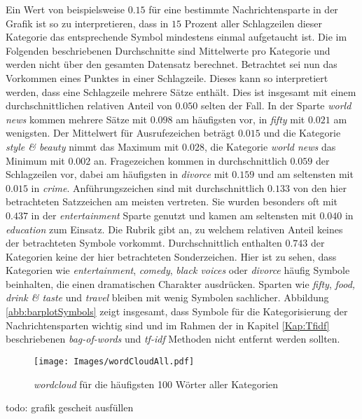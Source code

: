 \documentclass[a4paper,11pt]{article}
\begin{document}
Ein Wert von beispielsweise $0.15$ für eine bestimmte Nachrichtensparte in der Grafik ist so zu interpretieren, dass in $15$ Prozent aller Schlagzeilen dieser Kategorie das entsprechende Symbol mindestens einmal aufgetaucht ist. Die im Folgenden beschriebenen Durchschnitte sind Mittelwerte pro Kategorie und werden nicht über den gesamten Datensatz berechnet. Betrachtet sei nun das Vorkommen eines Punktes in einer Schlagzeile. Dieses kann so interpretiert werden, dass eine Schlagzeile mehrere Sätze enthält. Dies ist insgesamt mit einem durchschnittlichen relativen Anteil von $0.050$ selten der Fall. In der Sparte \textit{world news} kommen mehrere Sätze mit $0.098$ am häufigsten vor, in \textit{fifty} mit $0.021$ am wenigsten. Der Mittelwert für Ausrufezeichen beträgt $0.015$ und die Kategorie \textit{style \& beauty} nimmt das Maximum mit $0.028$, die Kategorie \textit{world news} das Minimum mit $0.002$ an. Fragezeichen kommen in durchschnittlich $0.059$ der Schlagzeilen vor, dabei am häufigsten in \textit{divorce} mit $0.159$ und am seltensten mit $0.015$ in \textit{crime}. Anführungszeichen sind mit durchschnittlich $0.133$ von den hier betrachteten Satzzeichen am meisten vertreten. Sie wurden besonders oft mit $0.437$ in der \textit{entertainment} Sparte genutzt und kamen am seltensten mit $0.040$ in \textit{education} zum Einsatz. Die Rubrik  gibt an, zu welchem relativen Anteil keines der betrachteten Symbole vorkommt. Durchschnittlich enthalten $0.743$ der Kategorien keine der hier betrachteten Sonderzeichen. Hier ist zu sehen, dass Kategorien wie \textit{entertainment}, \textit{comedy}, \textit{black voices} oder \textit{divorce} häufig Symbole beinhalten, die einen dramatischen Charakter ausdrücken. Sparten wie \textit{fifty}, \textit{food, drink \& taste} und \textit{travel} bleiben mit wenig Symbolen sachlicher. Abbildung \ref{abb:barplotSymbols} zeigt insgesamt, dass Symbole für die Kategorisierung der Nachrichtensparten wichtig sind und im Rahmen der in Kapitel \ref{Kap:Tfidf} beschriebenen \textit{bag-of-words} und \textit{tf-idf}  Methoden nicht entfernt werden sollten.

\begin{figure}[ht]
    \centering
\texttt{[image: Images/wordCloudAll.pdf]} 
\caption{\textit{wordcloud} für die häufigsten 100 Wörter aller Kategorien}
\label{abb:WordcloudAll}
\end{figure}
todo: grafik gescheit ausfüllen
\end{document}
